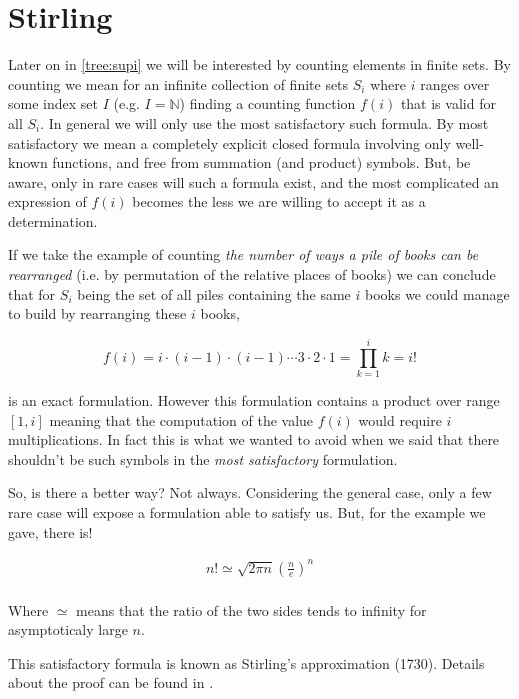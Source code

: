 \section{Stirling}
\label{tree:sorting:stirling}

Later on in \ref{tree:supi} we will be interested by counting elements in finite sets. By counting we mean for an infinite collection of finite sets $S_i$ where $i$ ranges over some index set $I$ (e.g. $I = \mathbb{N}$) finding a counting function $f(i)$ that is valid for all $S_i$. In general we will only use the most satisfactory such formula. By most satisfactory we mean a completely explicit closed formula involving only well-known functions, and free from summation (and product) symbols. But, be aware, only in rare cases will such a formula exist, and the most complicated an expression of $f(i)$ becomes the less we are willing to accept it as a determination. \cite{Stanley:2011:ECV:2124415}

If we take the example of counting \emph{the number of ways a pile of books can be rearranged} (i.e. by permutation of the relative places of books) we can conclude that for $S_i$ being the set of all piles containing the same $i$ books we could manage to build by rearranging these $i$ books,

$$ f(i) = i \cdot (i-1) \cdot (i-1) \cdots 3 \cdot 2 \cdot 1 = \prod_{k=1}^i k = i! $$

is an exact formulation. However this formulation contains a product over range $[1, i]$ meaning that the computation of the value $f(i)$ would require $i$ multiplications. In fact this is what we wanted to avoid when we said that there shouldn't be such symbols in the \emph{most satisfactory} formulation.

So, is there a better way? Not always. Considering the general case, only a few rare case will expose a formulation able to satisfy us. But, for the example we gave, there is!


\begin{theorem}
\label{tree:sorting:theorem/stirling}
\begin{align*}
n! \simeq \sqrt{2 \pi n} \left(\frac{n}{e}\right)^n\\
\end{align*}
\end{theorem}


Where $\simeq$ means that the ratio of the two sides tends to infinity for asymptoticaly large $n$.

This satisfactory formula is known as Stirling's approximation (1730). Details about the proof can be found in \cite{feller1967direct}.

